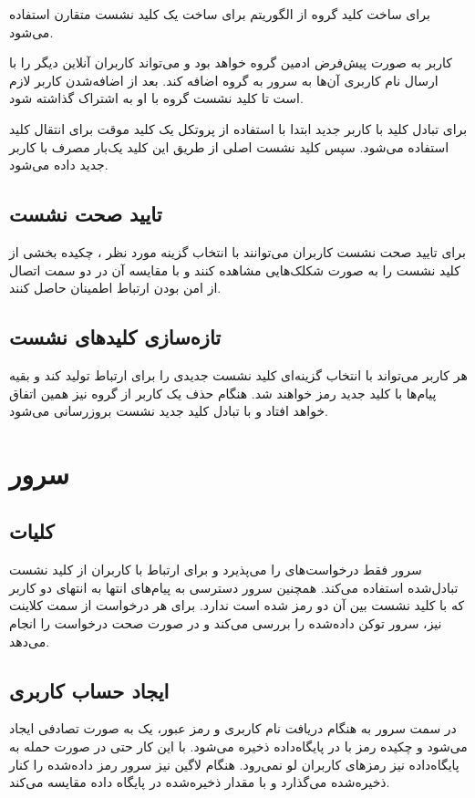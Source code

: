 \documentclass{article}
\begin{document}
برای ساخت کلید گروه از الگوریتم  برای ساخت یک کلید نشست متقارن استفاده می‌شود.

کاربر به صورت پیش‌فرض ادمین گروه خواهد بود و می‌تواند کاربران آنلاین دیگر را با ارسال نام کاربری آن‌ها به سرور به گروه اضافه کند.
بعد از اضافه‌شدن کاربر لازم است تا کلید نشست گروه با او به اشتراک گذاشته شود.

برای تبادل کلید با کاربر جدید ابتدا با استفاده از پروتکل   یک کلید موقت برای انتقال کلید استفاده می‌شود.
سپس کلید نشست اصلی از طریق این کلید یک‌بار مصرف با کاربر جدید داده می‌شود.

\subsection{تایید صحت نشست}
برای تایید صحت نشست کاربران می‌توانند با انتخاب گزینه مورد نظر ، چکیده بخشی از کلید نشست را به صورت شکلک‌هایی مشاهده کنند و با مقایسه آن در دو سمت اتصال از امن بودن ارتباط اطمینان حاصل کنند.

\subsection{تازه‌سازی کلیدهای نشست}
هر کاربر می‌تواند با انتخاب گزینه‌ای کلید نشست جدیدی را برای ارتباط تولید کند و بقیه پیام‌ها با کلید جدید رمز خواهند شد.
هنگام حذف یک کاربر از گروه نیز همین اتفاق خواهد افتاد و با تبادل کلید جدید نشست بروزرسانی می‌شود.

\section{سرور}
\subsection{کلیات}
سرور فقط درخواست‌های  را می‌پذیرد و برای ارتباط با کاربران از کلید نشست تبادل‌شده استفاده می‌کند.
همچنین سرور دسترسی به پیام‌های انتها به انتهای دو کاربر که با کلید نشست بین آن دو رمز شده است ندارد.
برای هر درخواست از سمت کلاینت نیز، سرور توکن داده‌شده را بررسی می‌کند و در صورت صحت درخواست را انجام می‌دهد.

\subsection{ایجاد حساب کاربری}
در سمت سرور به هنگام دریافت نام کاربری و رمز عبور، یک  به صورت تصادفی ایجاد می‌شود و چکیده رمز با  در پایگاه‌داده ذخیره می‌شود.
با این کار حتی در صورت حمله به پایگاه‌داده نیز رمزهای کاربران لو نمی‌رود.
هنگام لاگین نیز سرور رمز داده‌شده را کنار  ذخیره‌شده می‌گذارد و با مقدار ذخیره‌شده در پایگاه داده مقایسه می‌کند.
\end{document}
